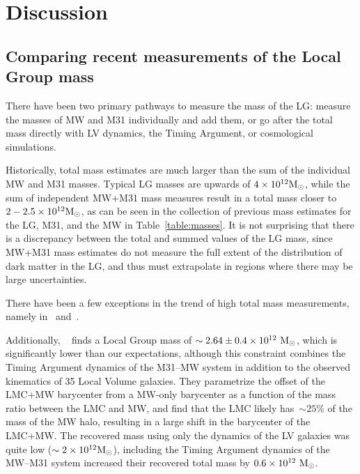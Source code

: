 \documentclass[twocolumn]{aastex631}
\begin{document}
\section{Discussion}
\label{sec:discussion}

\subsection{Comparing recent measurements of the Local Group mass}
There have been two primary pathways to measure the mass of the LG: 
measure the masses of MW and M31 individually and add them, or go after the 
total mass directly with LV dynamics, the Timing Argument, or cosmological 
simulations. 

Historically, total mass estimates are much larger than the sum of the 
individual MW and M31 masses. 
Typical LG masses are upwards of $4\times 10^{12}\mathrm{M}_\odot$, while the sum of 
independent MW+M31 mass measures result in a total mass closer to 
$2-2.5\times 10^{12}\mathrm{M}_\odot$, as can be seen in the collection of previous mass
estimates for the LG, M31, and the MW in Table~\ref{table:masses}. 
It is not surprising that there is a discrepancy between the total and summed 
values of the LG mass, since MW+M31 mass estimates do not measure the full 
extent of the distribution of dark matter in the LG, and thus must extrapolate 
in regions where there may be large uncertainties. 


There have been a few exceptions in the trend of high total mass measurements, 
namely in~\cite{Diaz2014} and~\cite{Penarrubia2016}. 

Additionally, ~\cite{Penarrubia2016} finds a Local Group mass of 
$\sim2.64\pm0.4\times 10^{12}~\mathrm{M}_\odot$, which is significantly lower than our 
expectations, although this constraint combines the Timing Argument dynamics of 
the M31--MW system in addition to the observed kinematics of 35 Local Volume 
galaxies. They parametrize the offset of the LMC+MW barycenter from a 
MW-only barycenter as a function of the mass ratio between the LMC and MW, and 
find that the LMC likely has~$\sim25\%$ of the mass of the MW halo, resulting in 
a large shift in the barycenter of the LMC+MW.
The recovered mass using only the dynamics of the LV galaxies was quite low  
($\sim 2\times 10^{12}\mathrm{M}_\odot$),
including the Timing Argument dynamics of the MW--M31 system increased their
recovered total 
mass by $0.6\times10^{12}~\mathrm{M}_\odot$. 
\end{document}
